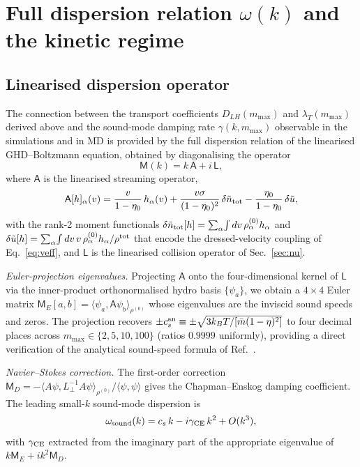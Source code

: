 \documentclass[aps,pre,twocolumn,superscriptaddress,longbibliography,floatfix]{revtex4-2}
\begin{document}
\section{Full dispersion relation $\omega(k)$ and the kinetic regime}
\label{sec:dispersion}

\subsection{Linearised dispersion operator}

The connection between the transport coefficients
$D_{LH}(m_{\max})$ and $\lambda_T(m_{\max})$ derived above
and the sound-mode damping rate $\gamma(k,m_{\max})$
observable in the simulations and in MD is provided by the
full dispersion relation of the linearised GHD--Boltzmann
equation, obtained by diagonalising the operator
\begin{equation}
\mathsf{M}(k) = k\,\mathsf{A} + i\,\mathsf{L},
\label{eq:dispop}
\end{equation}
where $\mathsf{A}$ is the linearised streaming operator,
\begin{equation}
\mathsf{A}[h]_\alpha(v)
= \frac{v}{1-\eta_0}\,h_\alpha(v)
+ \frac{v\sigma}{(1-\eta_0)^2}\,\delta\tilde n_{\rm tot}
- \frac{\eta_0}{1-\eta_0}\,\delta\tilde u,
\label{eq:Aop}
\end{equation}
with the rank-2 moment functionals
$\delta\tilde n_{\rm tot}[h]=\sum_\alpha\!\int dv\,
\rho_\alpha^{(0)}h_\alpha$ and
$\delta\tilde u[h]=\sum_\alpha\!\int dv\,v\,
\rho_\alpha^{(0)}h_\alpha/\rho^{\rm tot}$ that encode the
dressed-velocity coupling of Eq.~\eqref{eq:veff}, and
$\mathsf{L}$ is the linearised collision operator of
Sec.~\ref{sec:nu}.

\emph{Euler-projection eigenvalues.} Projecting
$\mathsf{A}$ onto the four-dimensional kernel of
$\mathsf{L}$ via the inner-product orthonormalised hydro
basis $\{\psi_a\}$, we obtain a $4\times 4$ Euler matrix
$\mathsf{M}_E[a,b]=\langle\psi_a,\mathsf{A}\psi_b\rangle_{\rho^{(0)}}$
whose eigenvalues are the inviscid sound speeds and zeros.
The projection recovers
$\pm c_s^{\rm an}\equiv\pm\sqrt{3k_BT/[\bar m(1-\eta)^2]}$
to four decimal places across $m_{\max}\in\{2,5,10,100\}$
(ratios $0.9999$ uniformly), providing a direct verification
of the analytical sound-speed formula of Ref.~\cite{PaperIV}.

\emph{Navier--Stokes correction.} The first-order
correction $\mathsf{M}_D = -\langle A\psi, L^{-1}_\perp
A\psi\rangle_{\rho^{(0)}}/\langle\psi,\psi\rangle$
gives the Chapman--Enskog damping coefficient. The leading
small-$k$ sound-mode dispersion is
\begin{equation}
\omega_{\rm sound}(k) = c_s\,k - i\gamma_{\rm CE}\,k^2
+ O(k^3),
\label{eq:omegaNS}
\end{equation}
with $\gamma_{\rm CE}$ extracted from the imaginary part
of the appropriate eigenvalue of $k\mathsf{M}_E+ik^2\mathsf{M}_D$.
\end{document}
